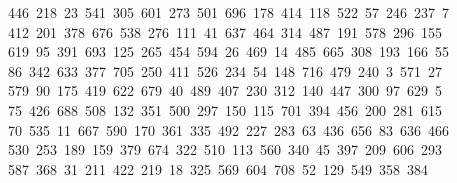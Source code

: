 \begin{tabbing}
\>\ 446\ 218\ 23\ 541\ 305\ 601\ 273\ 501\ 696\ 178\ 414\ 118\ 522\ 57\ 246\ 237\ 7\\[0pt]
\ 412\ 201\ 378\ 676\ 538\ 276\ 111\ 41\ 637\ 464\ 314\ 487\ 191\ 578\ 296\ 155\\[0pt]
\>\ 619\ 95\ 391\ 693\ 125\ 265\ 454\ 594\ 26\ 469\ 14\ 485\ 665\ 308\ 193\ 166\ 55\\[0pt]
\ 86\ 342\ 633\ 377\ 705\ 250\ 411\ 526\ 234\ 54\ 148\ 716\ 479\ 240\ 3\ 571\ 27\\[0pt]
\ 579\ 90\ 175\ 419\ 622\ 679\ 40\ 489\ 407\ 230\ 312\ 140\ 447\ 300\ 97\ 629\ 5\\[0pt]
\ 75\ 426\ 688\ 508\ 132\ 351\ 500\ 297\ 150\ 115\ 701\ 394\ 456\ 200\ 281\ 615\\[0pt]
\>\ 70\ 535\ 11\ 667\ 590\ 170\ 361\ 335\ 492\ 227\ 283\ 63\ 436\ 656\ 83\ 636\ 466\\[0pt]
\>\ 530\ 253\ 189\ 159\ 379\ 674\ 322\ 510\ 113\ 560\ 340\ 45\ 397\ 209\ 606\ 293\ \\[0pt]
\ 587\ 368\ 31\ 211\ 422\ 219\ 18\ 325\ 569\ 604\ 708\ 52\ 129\ 549\ 358\ 384\\[0pt]

\end{tabbing}
